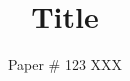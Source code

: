 \documentclass[10pt,twocolumn]{article}
\begin{document}
\title{\bf Title}
\author{Paper \# 123 XXX}
\date{}
\maketitle
\thispagestyle{empty}










 
\end{document}
